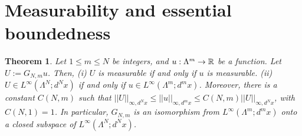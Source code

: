 \documentclass[12pt,leqno]{amsart}
\newtheorem{theor}{Theorem}[section]{\bf}{\it}
\numberwithin{equation}{section}
\numberwithin{theor}{section}
\numberwithin{rem}{section}
\begin{document}
\section{Measurability and essential boundedness\label{sec_measur}}

\begin{theor}
\label{Theor2}
Let $1\leq m\leq N$ be integers, and 
$u:\Lambda^m\rightarrow \Bbb{R}$ be a function.  
Let $U:=G_{N,m}u$.  
Then,
\newline
(i) $U$ is measurable if and only if $u$ is measurable.\newline
(ii) $U\in L^{\infty}(\Lambda^N; d^{N}x)$ if and only if 
$u\in L^{\infty}(\Lambda^m; d^{m}x)$.  Moreover, there is a 
constant $C(N,m)$ such that
$|| U ||_{\infty,d^{N}x}\leq || u ||_{\infty,d^{m}x}\leq 
C(N,m) || U ||_{\infty,d^{N}x}$, with 
$C(N,1)=1$.  In particular, 
$G_{N,m}$ is an isomorphism from $L^{\infty}(\Lambda^m; d^{m}x)$ onto a closed subspace of 
$L^{\infty}(\Lambda^N; d^{N}x)$.
\end{theor}
\end{document}
